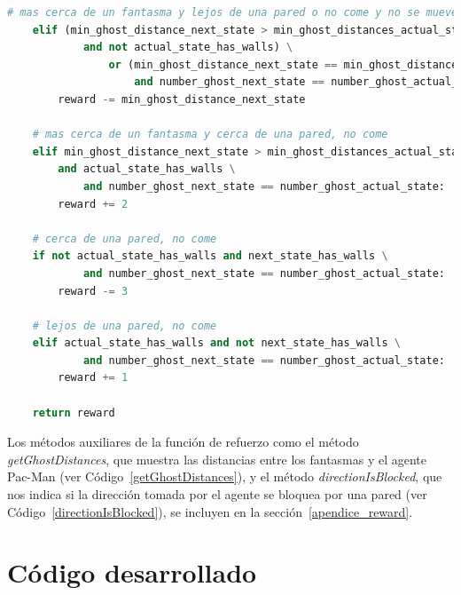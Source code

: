 \documentclass[11pt]{exam}
\begin{document}
\begin{lstlisting}[caption={Función de refuerzo.}, label={reward}, language=python, basicstyle=\scriptsize]
	 # mas cerca de un fantasma y lejos de una pared o no come y no se mueve
	elif (min_ghost_distance_next_state > min_ghost_distances_actual_state 
			and not actual_state_has_walls) \
				or (min_ghost_distance_next_state == min_ghost_distances_actual_state
					and number_ghost_next_state == number_ghost_actual_state):
		reward -= min_ghost_distance_next_state
	
	# mas cerca de un fantasma y cerca de una pared, no come
	elif min_ghost_distance_next_state > min_ghost_distances_actual_state \
		and actual_state_has_walls \
			and number_ghost_next_state == number_ghost_actual_state:
		reward += 2
	
	# cerca de una pared, no come
	if not actual_state_has_walls and next_state_has_walls \
			and number_ghost_next_state == number_ghost_actual_state:
		reward -= 3
		
	# lejos de una pared, no come
	elif actual_state_has_walls and not next_state_has_walls \
			and number_ghost_next_state == number_ghost_actual_state:
		reward += 1
	
	return reward
\end{lstlisting}

Los métodos auxiliares de la función de refuerzo como el método \textit{getGhostDistances}, que muestra las distancias entre los fantasmas y el agente Pac-Man (ver Código~\ref{getGhostDistances}), y el método \textit{directionIsBlocked}, que nos indica si la dirección tomada por el agente se bloquea por una pared (ver Código~\ref{directionIsBlocked}), se incluyen en la sección~\ref*{apendice_reward}.

\section{Código desarrollado}\label{codigo}
\end{document}
